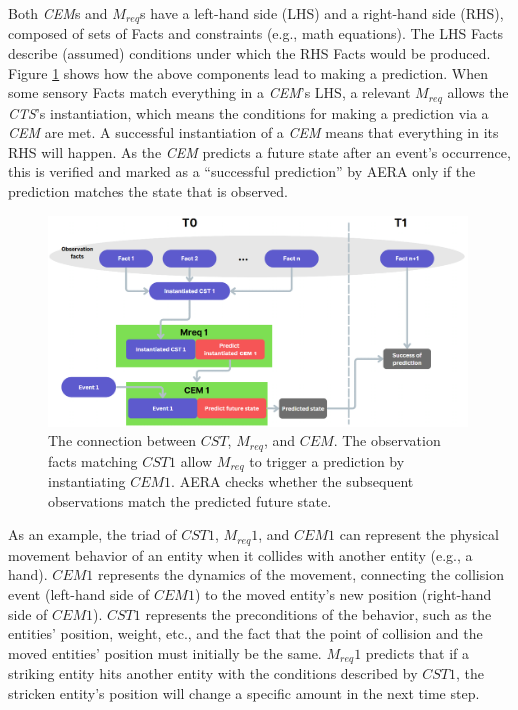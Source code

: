 \documentclass[runningheads]{llncs}
\begin{document}
Both \textit{CEM}s and $M_{req}$s have a left-hand side (LHS) and a right-hand side (RHS), composed of sets of Facts and constraints (e.g., math equations). The LHS Facts describe (assumed) conditions under which the RHS Facts would be produced. Figure \ref{fig:AERA} shows how the above components lead to making a prediction. When some sensory Facts match everything in a \textit{CEM}’s LHS, a relevant $M_{req}$ allows the \textit{CTS}’s instantiation, which means the conditions for making a prediction via a \textit{CEM} are met. A successful instantiation of a \textit{CEM} means that everything in its RHS will happen. 
As the \textit{CEM} predicts a future state after an event’s occurrence, this is verified and marked as a “successful prediction” by AERA only if the prediction matches the state that is observed.

\begin{figure}
	\centering
	\includegraphics[width=0.99\textwidth]{AERAblockdiagram2.png}
	\caption{The connection between $CST$, $M_{req}$, and $CEM$. The observation facts matching $CST1$ allow $M_{req}$ to trigger a prediction by instantiating $CEM1$. AERA checks whether the subsequent observations match the predicted future state.} 
	\label{fig:AERA}
\end{figure}

As an example, the triad of $CST1$, $M_{req}1$, and $CEM1$ can represent the physical movement behavior of an entity when it collides with another entity (e.g., a hand). $CEM1$ represents the dynamics of the movement, connecting the collision event (left-hand side of $CEM1$) to the moved entity’s new position (right-hand side of $CEM1$). $CST1$ represents the preconditions of the behavior, such as the entities’ position, weight, etc., and the fact that the point of collision and the moved entities' position must initially be the same. $M_{req}1$ predicts that if a striking entity hits another entity with the conditions described by $CST1$, the stricken entity’s position will change a specific amount in the next time step.
\end{document}

